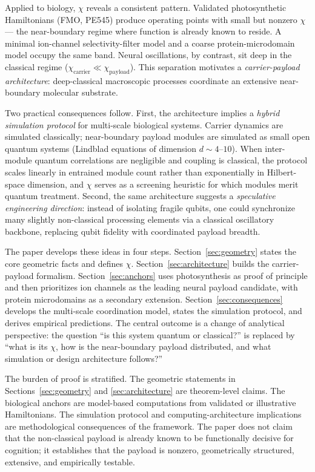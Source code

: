 \documentclass[11pt,a4paper]{article}
\theoremstyle{definition}
\theoremstyle{remark}
\begin{document}
Applied to biology, $\chi$ reveals a consistent pattern. Validated photosynthetic Hamiltonians (FMO, PE545) produce operating points with small but nonzero $\chi$ --- the near-boundary regime where function is already known to reside. A minimal ion-channel selectivity-filter model and a coarse protein-microdomain model occupy the same band. Neural oscillations, by contrast, sit deep in the classical regime ($\chi_{\mathrm{carrier}} \ll \chi_{\mathrm{payload}}$). This separation motivates a \emph{carrier-payload architecture}: deep-classical macroscopic processes coordinate an extensive near-boundary molecular substrate.

Two practical consequences follow. First, the architecture implies a \emph{hybrid simulation protocol} for multi-scale biological systems. Carrier dynamics are simulated classically; near-boundary payload modules are simulated as small open quantum systems (Lindblad equations of dimension $d\sim 4$--$10$). When inter-module quantum correlations are negligible and coupling is classical, the protocol scales linearly in entrained module count rather than exponentially in Hilbert-space dimension, and $\chi$ serves as a screening heuristic for which modules merit quantum treatment. Second, the same architecture suggests a \emph{speculative engineering direction}: instead of isolating fragile qubits, one could synchronize many slightly non-classical processing elements via a classical oscillatory backbone, replacing qubit fidelity with coordinated payload breadth.

The paper develops these ideas in four steps. Section~\ref{sec:geometry} states the core geometric facts and defines $\chi$. Section~\ref{sec:architecture} builds the carrier-payload formalism. Section~\ref{sec:anchors} uses photosynthesis as proof of principle and then prioritizes ion channels as the leading neural payload candidate, with protein microdomains as a secondary extension. Section~\ref{sec:consequences} develops the multi-scale coordination model, states the simulation protocol, and derives empirical predictions. The central outcome is a change of analytical perspective: the question ``is this system quantum or classical?'' is replaced by ``what is its $\chi$, how is the near-boundary payload distributed, and what simulation or design architecture follows?''

The burden of proof is stratified. The geometric statements in Sections~\ref{sec:geometry} and \ref{sec:architecture} are theorem-level claims. The biological anchors are model-based computations from validated or illustrative Hamiltonians. The simulation protocol and computing-architecture implications are methodological consequences of the framework. The paper does not claim that the non-classical payload is already known to be functionally decisive for cognition; it establishes that the payload is nonzero, geometrically structured, extensive, and empirically testable.
\end{document}
